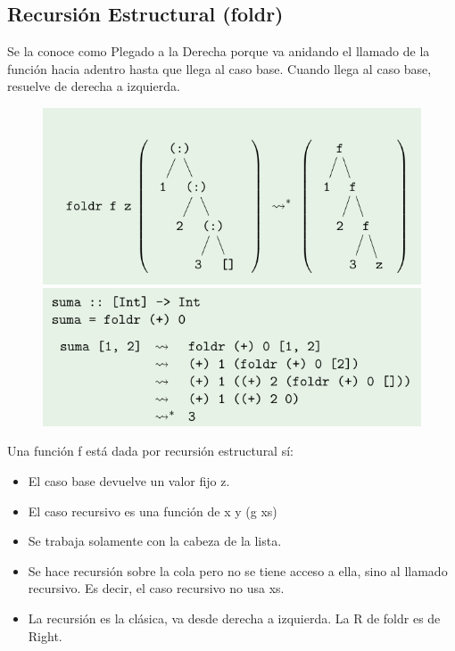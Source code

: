 \documentclass[10pt,a4paper]{article}
\begin{document}
\subsection*{Recursión Estructural (foldr)}
Se la conoce como Plegado a la Derecha porque va anidando el llamado de la función hacia adentro hasta que llega al caso base. Cuando llega al caso base, resuelve de derecha a izquierda. 
\begin{figure}[h]
    \centering
    \begin{minipage}[b]{0.5\textwidth}
        \centering
        \includegraphics[width=\linewidth]{assets/foldr_grafico.png}
    \end{minipage}%
    \begin{minipage}[b]{0.5\textwidth}
        \centering
        \includegraphics[width=\linewidth]{assets/suma_foldr.png}
    \end{minipage}
\end{figure}
Una función f está dada por recursión estructural sí: 
\begin{itemize}
    \item El caso base devuelve un valor fijo z.
    \item El caso recursivo es una función de x y (g xs)
    \item Se trabaja solamente con la cabeza de la lista.
    \item Se hace recursión sobre la cola pero no se tiene acceso a ella, sino al llamado recursivo.  Es decir, el caso recursivo no usa xs. 
    \item La recursión es la clásica, va desde derecha a izquierda. La R de foldr es de Right. 
\end{itemize}
\end{document}
